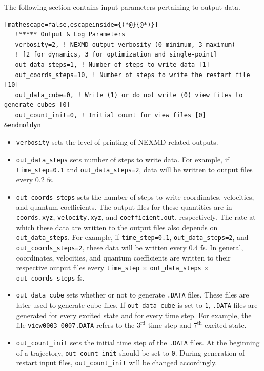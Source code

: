 \documentclass[letterpaper,12pt,titlepage]{article}
\begin{document}
The following section contains input parameters pertaining to output data.
\begin{lstlisting}[mathescape=false,escapeinside={(*@}{@*)}]
   !***** Output & Log Parameters
   verbosity=2, ! NEXMD output verbosity (0-minimum, 3-maximum)
   ! [2 for dynamics, 3 for optimization and single-point]
   out_data_steps=1, ! Number of steps to write data [1]
   out_coords_steps=10, ! Number of steps to write the restart file [10]
   out_data_cube=0, ! Write (1) or do not write (0) view files to generate cubes [0]
   out_count_init=0, ! Initial count for view files [0]
&endmoldyn
\end{lstlisting}
\begin{itemize}
\item \verb+verbosity+ sets the level of printing of NEXMD related outputs.
\item \verb+out_data_steps+ sets number of steps to write data.  For example, if \verb+time_step=0.1+ and \verb+out_data_steps=2+, data will be written to output files every 0.2 fs.
\item \verb+out_coords_steps+ sets the number of steps to write coordinates, velocities, and quantum coefficients.  The output files for these quantities are in \verb+coords.xyz+, \verb+velocity.xyz+, and \verb+coefficient.out+, respectively.  The rate at which these data are written to the output files also depends on \verb+out_data_steps+.  For example, if \verb+time_step=0.1+, \verb+out_data_steps=2+, and \verb+out_coords_steps=2+, these data will be written every 0.4 fs.  In general, coordinates, velocities, and quantum coefficients are written to their respective output files every \verb+time_step+ $\times$ \verb+out_data_steps+ $\times$ \verb+out_coords_steps+ fs.
\item \verb+out_data_cube+ sets whether or not to generate \verb+.DATA+ files.  These files are later used to generate cube files.  If \verb+out_data_cube+ is set to \verb+1+, \verb+.DATA+ files are generated for every excited state and for every time step.  For example, the file \verb+view0003-0007.DATA+ refers to the $3^{\text{rd}}$ time step and $7^{\text{th}}$ excited state.
\item \verb+out_count_init+ sets the initial time step of the \verb+.DATA+ files.  At the beginning of a trajectory, \verb+out_count_init+ should be set to \verb+0+.  During generation of restart input files, \verb+out_count_init+ will be changed accordingly.
\end{itemize}
\end{document}
